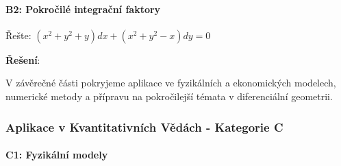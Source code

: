 \vspace{0.8\baselineskip}

\paragraph*{B2: Pokročilé integrační faktory}

\begin{example}
Řešte: $(x^2 + y^2 + y)dx + (x^2 + y^2 - x)dy = 0$
\vspace{0.3\baselineskip}

\textbf{Řešení}:
\end{example}

\vspace{0.8\baselineskip}

\begin{transition}
V závěrečné části pokryjeme aplikace ve fyzikálních a ekonomických modelech, numerické metody a přípravu na pokročilejší témata v diferenciální geometrii.
\end{transition}

\subsubsection{Aplikace v Kvantitativních Vědách - Kategorie C}
\label{subsubsec:aplikace-kategorie-c}

\paragraph*{C1: Fyzikální modely}

